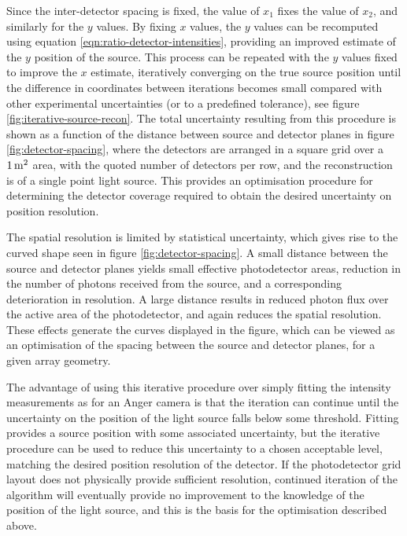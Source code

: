 Since the inter-detector spacing is fixed, the value of $x_1$ fixes the value of $x_2$, and similarly for the $y$ values. By fixing $x$ values, the $y$ values can be recomputed using equation \eqref{eqn:ratio-detector-intensities}, providing an improved estimate of the $y$ position of the source. This process can be repeated with the $y$ values fixed to improve the $x$ estimate, iteratively converging on the true source position until the difference in coordinates between iterations becomes small compared with other experimental uncertainties (or to a predefined tolerance), see figure \ref{fig:iterative-source-recon}. The total uncertainty resulting from this procedure is shown as a function of the distance between source and detector planes in figure \ref{fig:detector-spacing}, where the detectors are arranged in a square grid over a $1\metre^2$ area, with the quoted number of detectors per row, and the reconstruction is of a single point light source. This provides an optimisation procedure for determining the detector coverage required to obtain the desired uncertainty on position resolution.

The spatial resolution is limited by statistical uncertainty, which gives rise to the curved shape seen in figure \ref{fig:detector-spacing}. A small distance between the source and detector planes yields small effective photodetector areas, reduction in the number of photons received from the source, and a corresponding deterioration in resolution. A large distance results in reduced photon flux over the active area of the photodetector, and again reduces the spatial resolution. These effects generate the curves displayed in the figure, which can be viewed as an optimisation of the spacing between the source and detector planes, for a given array geometry.

The advantage of using this iterative procedure over simply fitting the intensity measurements as for an Anger camera is that the iteration can continue until the uncertainty on the position of the light source falls below some threshold. Fitting provides a source position with some associated uncertainty, but the iterative procedure can be used to reduce this uncertainty to a chosen acceptable level, matching the desired position resolution of the detector. If the photodetector grid layout does not physically provide sufficient resolution, continued iteration of the algorithm will eventually provide no improvement to the knowledge of the position of the light source, and this is the basis for the optimisation described above.

